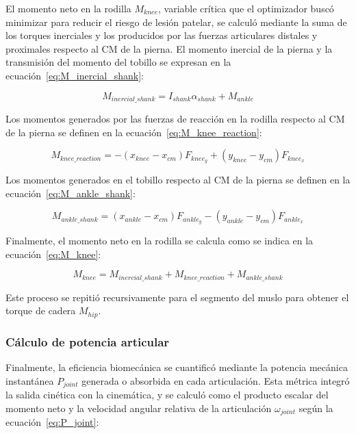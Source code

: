 El momento neto en la rodilla $M_{knee}$, variable crítica que el optimizador
buscó minimizar para reducir el riesgo de lesión patelar, se calculó mediante
la suma de los torques inerciales y los producidos por las fuerzas articulares
distales y proximales respecto al CM de la pierna. El momento inercial de la
pierna y la transmisión del momento del tobillo se expresan en la ecuación~\ref{eq:M_inercial_shank}:

\begin{equation}
  \label{eq:M_inercial_shank}
  M_{inercial\_shank} = I_{shank} \alpha_{shank} + M_{ankle}
\end{equation}

Los momentos generados por las fuerzas de reacción en la rodilla respecto al CM
de la pierna se definen en la ecuación~\ref{eq:M_knee_reaction}:

\begin{equation}
  \label{eq:M_knee_reaction}
  M_{knee\_reaction} = -(x_{knee}-x_{cm}) F_{knee_y} + (y_{knee}-y_{cm}) F_{knee_x}
\end{equation}

Los momentos generados en el tobillo respecto al CM de la pierna se definen en la ecuación~\ref{eq:M_ankle_shank}:

\begin{equation}
  \label{eq:M_ankle_shank}
  M_{ankle\_shank} = (x_{ankle}-x_{cm}) F_{ankle_y} - (y_{ankle}-y_{cm}) F_{ankle_x}
\end{equation}

Finalmente, el momento neto en la rodilla se calcula como se indica en la
ecuación~\ref{eq:M_knee}:

\begin{equation}
  \label{eq:M_knee}
  M_{knee} = M_{inercial\_shank} + M_{knee\_reaction} + M_{ankle\_shank}
\end{equation}

Este proceso se repitió recursivamente para el segmento del muslo para obtener
el torque de cadera $M_{hip}$.

\subsubsection{Cálculo de potencia articular}
Finalmente, la eficiencia biomecánica se cuantificó mediante la potencia
mecánica instantánea $P_{joint}$ generada o absorbida en cada articulación.
Esta métrica integró la salida cinética con la cinemática, y se calculó como el
producto escalar del momento neto y la velocidad angular relativa de la
articulación $\omega_{joint}$ según la ecuación~\ref{eq:P_joint}:

